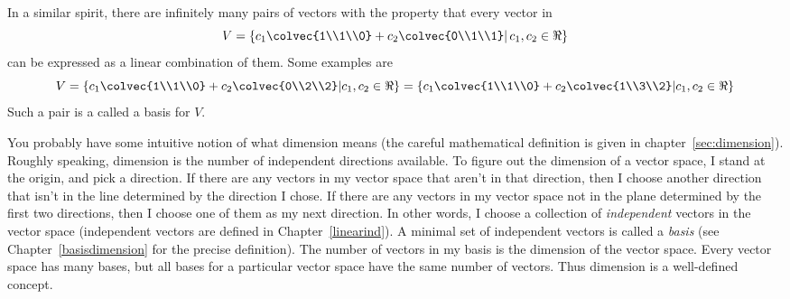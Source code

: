 In a similar spirit, there are infinitely many pairs of vectors with the property that every vector in 
\[V=\left\{  c_1\colvec{1\\1\\0} +c_2\colvec{0\\1\\1} \middle\vert \, c_1,c_2\in \Re \right\} \] 
can be expressed as a linear combination of them. Some examples are 
\[V=
\left\{ c_1\colvec{1\\1\\0} +c_2\colvec{0\\2\\2}  \middle\vert c_1,c_2\in \Re \right\} 
=\left\{c_1 \colvec{1\\1\\0}+c_2 \colvec{1\\3\\2}  \middle\vert c_1,c_2\in \Re \right\} 
\]
Such a pair is a  called a basis for $V$.




You probably have some intuitive notion of what dimension means
(the careful mathematical definition is given in chapter~\ref{sec:dimension}).
Roughly speaking, dimension is the number of independent directions available.  To figure out the dimension of a vector space, I stand at the origin, and pick a direction.  If there are any vectors in my vector space that aren't in that direction, then I choose another direction that isn't in the line determined by the direction I chose.  If there are any vectors in my vector space not in the plane determined by the first two directions, then I choose one of them as my next direction.  In other words, I choose a collection of \emph{independent} vectors in the vector space (independent vectors are defined in Chapter~\ref{linearind}).  
A minimal set of independent vectors is called a {\itshape basis} (see Chapter~\ref{basisdimension} for the precise definition). 
The number of vectors in my basis is the dimension of the vector space. 
Every vector space has many bases, but all bases for a particular vector space have the same number of vectors. Thus dimension is a well-defined concept. 

